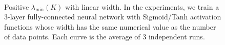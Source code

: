 \begin{figure}[h!] 
\centering
 \\
\caption[]{Positive $\lambda_{\min}(K)$ with linear width. In the experiments, we train a 3-layer fully-connected neural network with Sigmoid/Tanh activation functions whose width has the same numerical value as the number of data points. Each curve is the average of 3 independent runs.\label{fig:min_ntk}}
\end{figure}